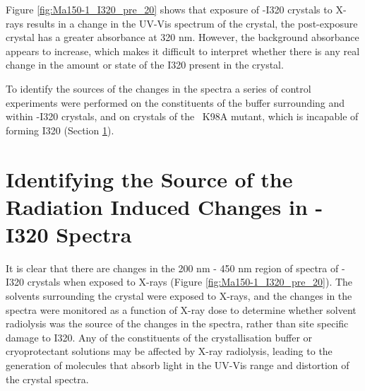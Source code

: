 Figure \ref{fig:Ma150-1_I320_pre_20} shows that exposure of \atpdx -I320 crystals to X-rays results in a change in the UV-Vis spectrum of the crystal, the post-exposure crystal has a greater absorbance at 320 \si{\nano\metre}. However, the background absorbance appears to increase, which makes it difficult to interpret whether there is any real change in the amount or state of the I320 present in the crystal.

To identify the sources of the changes in the spectra a series of control experiments were performed on the constituents of the buffer surrounding and within \atpdx -I320 crystals, and on crystals of the \atpdx ~K98A mutant, which is incapable of forming I320 (Section \ref{Sec:SpecRADDAM}).  
\newpage

\section{Identifying the Source of the Radiation Induced Changes in \atpdx -I320 Spectra}\label{Sec:SpecRADDAM}

It is clear that there are changes in the 200 nm - 450 nm region of spectra of \atpdx -I320 crystals when exposed to X-rays (Figure \ref{fig:Ma150-1_I320_pre_20}). The solvents surrounding the crystal were exposed to X-rays, and the changes in the spectra were monitored as a function of X-ray dose to determine whether solvent radiolysis was the source of the changes in the spectra, rather than site specific damage to I320. Any of the constituents of the crystallisation buffer or cryoprotectant solutions may be affected by X-ray radiolysis, leading to the generation of molecules that absorb light in the UV-Vis range and distortion of the crystal spectra. 

